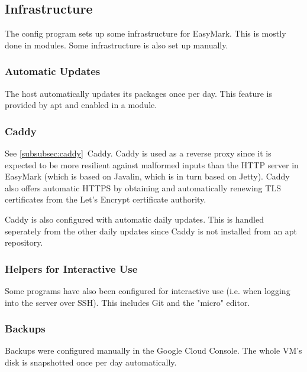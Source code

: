 \documentclass[12pt,a4paper,oneside]{report}
\begin{document}
	\subsection{Infrastructure}
	The config program sets up some infrastructure for EasyMark. This is mostly done in modules. Some infrastructure is also set up manually.

	\subsubsection{Automatic Updates}
	The host automatically updates its packages once per day. This feature is provided by apt and enabled in a module.

	\subsubsection{Caddy}
	See \ref{subsubsec:caddy}~Caddy. Caddy is used as a reverse proxy since it is expected to be more resilient against malformed inputs than the HTTP server in EasyMark (which is based on Javalin, which is in turn based on Jetty). Caddy also offers automatic HTTPS by obtaining and automatically renewing TLS certificates from the Let's Encrypt certificate authority.

	Caddy is also configured with automatic daily updates. This is handled seperately from the other daily updates since Caddy is not installed from an apt repository.

	\subsubsection{Helpers for Interactive Use}
	Some programs have also been configured for interactive use (i.e. when logging into the server over SSH). This includes Git and the "micro" editor.

	\subsubsection{Backups}
	Backups were configured manually in the Google Cloud Console. The whole VM's disk is snapshotted once per day automatically.

	\printbibliography[title={\hspace{\fill}Bibliography}]

	\pagebreak
	\listoffigures
\end{document}
